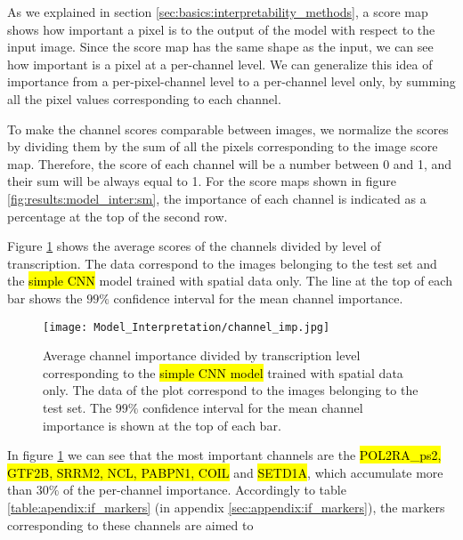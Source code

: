 As we explained in section \ref{sec:basics:interpretability_methods}, a score map shows how important a pixel is to the output of the model with respect to the input image. Since the score map has the same shape as the input, we can see how important is a pixel at a per-channel level.
We can generalize this idea of importance from a per-pixel-channel level to a per-channel level only, by summing all the pixel values corresponding to each channel.

To make the channel scores comparable between images, we normalize the scores by dividing them by the sum of all the pixels corresponding to the image score map. Therefore, the score of each channel will be a number between 0 and 1, and their sum will be always equal to 1. For the score maps shown in figure \ref{fig:results:model_inter:sm}, the importance of each channel is indicated as a percentage at the top of the second row.

Figure \ref{fig:results:model_int:channel_imp} shows the average scores of the channels divided by level of transcription. The data correspond to the images belonging to the test set and the \hl{simple CNN} model trained with spatial data only. The line at the top of each bar shows the $99\%$ confidence interval for the mean channel importance.

\begin{figure}[htb]
  \centering
  \texttt{[image: Model\_Interpretation/channel\_imp.jpg]}
  \caption{Average channel importance divided by transcription level corresponding to the \hl{simple CNN model} trained with spatial data only. The data of the plot correspond to the images belonging to the test set. The $99\%$ confidence interval for the mean channel importance is shown at the top of each bar.}
  \label{fig:results:model_int:channel_imp}
\end{figure}

In figure \ref{fig:results:model_int:channel_imp} we can see that the most important channels are the \hl{POL2RA\_ps2, GTF2B, SRRM2, NCL, PABPN1, COIL} and \hl{SETD1A}, which accumulate more than $30\%$ of the per-channel importance.
Accordingly to table \ref{table:apendix:if_markers} (in appendix \ref{sec:appendix:if_markers}), the markers corresponding to these channels are aimed to

